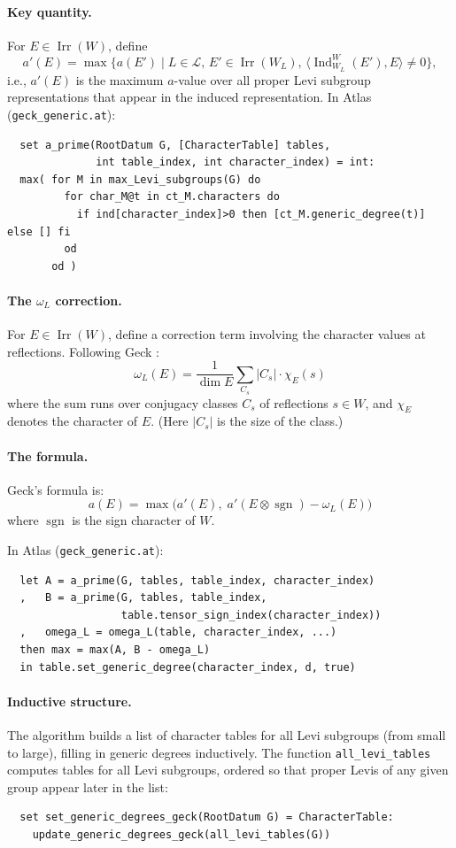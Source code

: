 \documentclass[12pt]{amsart}
\newcommand{\Ind}{\operatorname{Ind}}
\newcommand{\sgn}{\operatorname{sgn}}
\newcommand{\Irr}{\operatorname{Irr}}
\begin{document}
\paragraph{Key quantity.} For $E \in \Irr(W)$, define
\[
  a'(E) = \max \bigl\{ a(E') \mid L \in \mathcal{L},\, E' \in \Irr(W_L),\,
                        \langle \Ind_{W_L}^W(E'), E \rangle \neq 0 \bigr\},
\]
i.e., $a'(E)$ is the maximum $a$-value over all proper Levi subgroup
representations that appear in the induced representation.  In Atlas
(\texttt{geck\_generic.at}):
\begin{verbatim}
  set a_prime(RootDatum G, [CharacterTable] tables,
              int table_index, int character_index) = int:
  max( for M in max_Levi_subgroups(G) do
         for char_M@t in ct_M.characters do
           if ind[character_index]>0 then [ct_M.generic_degree(t)] else [] fi
         od
       od )
\end{verbatim}

\paragraph{The $\omega_L$ correction.} For $E \in \Irr(W)$, define a
correction term involving the character values at reflections.  Following Geck
\cite[Definition 4.1]{Geck:chevie}:
\[
  \omega_L(E) = \frac{1}{\dim E} \sum_{C_s}
    |C_s| \cdot \chi_E(s)
\]
where the sum runs over conjugacy classes $C_s$ of reflections $s \in W$, and
$\chi_E$ denotes the character of $E$.  (Here $|C_s|$ is the size of the
class.)

\paragraph{The formula.} Geck's formula is:
\begin{equation}
  \label{eq:geck}
  a(E) = \max \bigl( a'(E),\; a'(E \otimes \sgn) - \omega_L(E) \bigr)
\end{equation}
where $\sgn$ is the sign character of $W$.

In Atlas (\texttt{geck\_generic.at}):
\begin{verbatim}
  let A = a_prime(G, tables, table_index, character_index)
  ,   B = a_prime(G, tables, table_index,
                  table.tensor_sign_index(character_index))
  ,   omega_L = omega_L(table, character_index, ...)
  then max = max(A, B - omega_L)
  in table.set_generic_degree(character_index, d, true)
\end{verbatim}

\paragraph{Inductive structure.} The algorithm builds a list of character
tables for all Levi subgroups (from small to large), filling in generic degrees
inductively.  The function \texttt{all\_levi\_tables} computes tables for all
Levi subgroups, ordered so that proper Levis of any given group appear later in
the list:
\begin{verbatim}
  set set_generic_degrees_geck(RootDatum G) = CharacterTable:
    update_generic_degrees_geck(all_levi_tables(G))
\end{verbatim}
\end{document}
